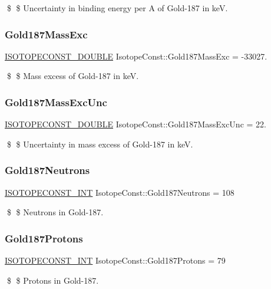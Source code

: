 \$ \$ Uncertainty in binding energy per A of Gold-\/187 in keV. \mbox{\label{group___isotope_const-_gold-_au187_gacc262740c050964c8ec31378ff7cf144}} 
\subsubsection{\texorpdfstring{Gold187\+Mass\+Exc}{Gold187MassExc}}
{\footnotesize\ttfamily \mbox{\hyperlink{group___isotope_const-_macros_ga8f45a7272ce02c0b4c65c44636ed719a}{I\+S\+O\+T\+O\+P\+E\+C\+O\+N\+S\+T\+\_\+\+D\+O\+U\+B\+LE}} Isotope\+Const\+::\+Gold187\+Mass\+Exc = -\/33027.}

\$ \$ Mass excess of Gold-\/187 in keV. \mbox{\label{group___isotope_const-_gold-_au187_ga0173e30cd3e6322ec81e8e7ab992a79a}} 
\subsubsection{\texorpdfstring{Gold187\+Mass\+Exc\+Unc}{Gold187MassExcUnc}}
{\footnotesize\ttfamily \mbox{\hyperlink{group___isotope_const-_macros_ga8f45a7272ce02c0b4c65c44636ed719a}{I\+S\+O\+T\+O\+P\+E\+C\+O\+N\+S\+T\+\_\+\+D\+O\+U\+B\+LE}} Isotope\+Const\+::\+Gold187\+Mass\+Exc\+Unc = 22.}

\$ \$ Uncertainty in mass excess of Gold-\/187 in keV. \mbox{\label{group___isotope_const-_gold-_au187_ga70992341677ea6a53479831d30239f6b}} 
\subsubsection{\texorpdfstring{Gold187\+Neutrons}{Gold187Neutrons}}
{\footnotesize\ttfamily \mbox{\hyperlink{group___isotope_const-_macros_ga5f18360b3e99483a35c32d789e62621c}{I\+S\+O\+T\+O\+P\+E\+C\+O\+N\+S\+T\+\_\+\+I\+NT}} Isotope\+Const\+::\+Gold187\+Neutrons = 108}

\$ \$ Neutrons in Gold-\/187. \mbox{\label{group___isotope_const-_gold-_au187_gaeadc227dddd40564d1fadc910a652317}} 
\subsubsection{\texorpdfstring{Gold187\+Protons}{Gold187Protons}}
{\footnotesize\ttfamily \mbox{\hyperlink{group___isotope_const-_macros_ga5f18360b3e99483a35c32d789e62621c}{I\+S\+O\+T\+O\+P\+E\+C\+O\+N\+S\+T\+\_\+\+I\+NT}} Isotope\+Const\+::\+Gold187\+Protons = 79}

\$ \$ Protons in Gold-\/187. 